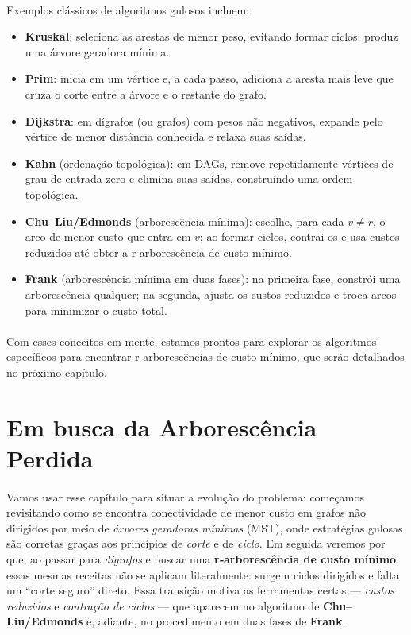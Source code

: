 \documentclass[12pt,a4paper]{article}
\begin{document}
\paragraph{}
Exemplos clássicos de algoritmos gulosos incluem:

\begin{itemize}
        \item \textbf{Kruskal}: seleciona as arestas de menor peso, evitando formar ciclos; produz uma árvore geradora mínima.
        \item \textbf{Prim}: inicia em um vértice e, a cada passo, adiciona a aresta mais leve que cruza o corte entre a árvore e o restante do grafo.
        \item \textbf{Dijkstra}: em dígrafos (ou grafos) com pesos não negativos, expande pelo vértice de menor distância conhecida e relaxa suas saídas.
        \item  \textbf{Kahn} (ordenação topológica): em DAGs, remove repetidamente vértices de grau de entrada zero e elimina suas saídas, construindo uma ordem topológica.
        \item \textbf{Chu–Liu/Edmonds} (arborescência mínima): escolhe, para cada \(v\neq r\), o arco de menor custo que entra em \(v\); ao formar ciclos, contrai-os e usa custos reduzidos até obter a r‑arborescência de custo mínimo.
       \item \textbf{Frank} (arborescência mínima em duas fases): na primeira fase, constrói uma arborescência qualquer; na segunda, ajusta os custos reduzidos e troca arcos para minimizar o custo total.
\end{itemize}

\paragraph{}
Com esses conceitos em mente, estamos prontos para explorar os algoritmos específicos para encontrar r-arborescências de custo mínimo, que serão detalhados no próximo capítulo.

\section{Em busca da Arborescência Perdida}

\paragraph{}
Vamos usar esse capítulo para situar a evolução do problema: começamos revisitando como se encontra conectividade de menor custo em grafos não dirigidos por meio de \emph{árvores geradoras mínimas} (MST), onde estratégias gulosas são corretas graças aos princípios de \emph{corte} e de \emph{ciclo}. Em seguida veremos por que, ao passar para \emph{dígrafos} e buscar uma \textbf{r‑arborescência de custo mínimo}, essas mesmas receitas não se aplicam literalmente: surgem ciclos dirigidos e falta um “corte seguro” direto. Essa transição motiva as ferramentas certas — \emph{custos reduzidos} e \emph{contração de ciclos} — que aparecem no algoritmo de \textbf{Chu–Liu/Edmonds} e, adiante, no procedimento em duas fases de \textbf{Frank}.
\end{document}
